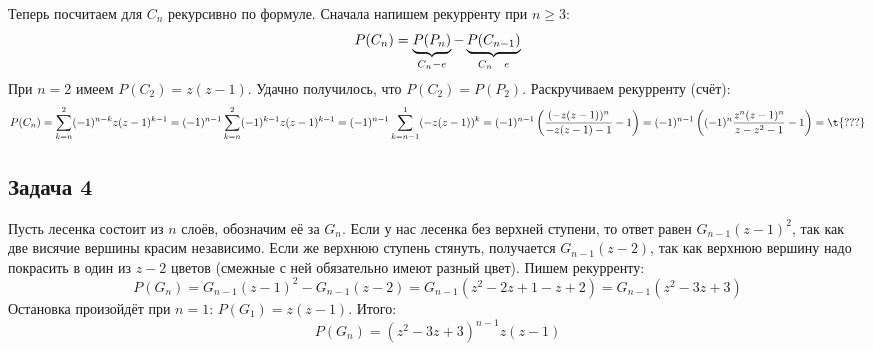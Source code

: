 	Теперь посчитаем для $C_n$ рекурсивно по формуле.
	Сначала напишем рекурренту при $n \ge 3$:
	\[
		P(C_n) = \underbrace{P(P_n)}_{C_n - e} - \underbrace{P(C_{n-1})}_{C_n\\e}
	\]
	При $n = 2$ имеем $P(C_2)=z(z-1)$.
	Удачно получилось, что $P(C_2)=P(P_2)$.
	Раскручиваем рекурренту (\TODO счёт):
	\[
		P(C_n) =
		\sum_{k=n}^{2} (-1)^{n-k}z(z-1)^{k-1} =
		(-1)^{n-1}\sum_{k=n}^{2} (-1)^{k-1}z(z-1)^{k-1} =
		(-1)^{n-1}\sum_{k=n-1}^{1} (-z(z-1))^{k} =
		(-1)^{n-1}\left(\frac{(-z(z-1))^n}{-z(z-1)-1} - 1\right) =
		(-1)^{n-1}\left((-1)^n\frac{z^n(z-1)^n}{z-z^2-1} - 1\right) =
		\t{???}
	\]

\subsection{Задача 4}
	Пусть лесенка состоит из $n$ слоёв, обозначим её за $G_n$.
	Если у нас лесенка без верхней ступени, то ответ равен $G_{n-1}(z-1)^2$, так как две висячие вершины красим независимо.
	Если же верхнюю ступень стянуть, получается $G_{n-1}(z-2)$, так как верхнюю вершину надо покрасить в один из $z-2$ цветов (смежные с ней обязательно имеют разный цвет).
	Пишем рекурренту:
	\[
		P(G_n) = G_{n-1}(z-1)^2 - G_{n-1}(z-2) = G_{n-1}(z^2-2z+1-z+2) = G_{n-1}(z^2-3z+3)
	\]
	Остановка произойдёт при $n=1$: $P(G_1)=z(z-1)$.
	Итого:
	\[
		P(G_n) = (z^2-3z+3)^{n-1}z(z-1)
	\]
